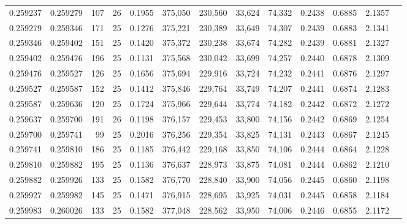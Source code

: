 \begin{tabular}{rrrrrrrrrrrrr}
0.259237 & 0.259279 &   107 &  26 &                                     0.1955 & 375,050 & 230,560 &  33,624 &  74,332 & 0.2438 & 0.6885 & 2.1357 \\
0.259279 & 0.259346 &   171 &  25 &                                     0.1276 & 375,221 & 230,389 &  33,649 &  74,307 & 0.2439 & 0.6883 & 2.1341 \\
0.259346 & 0.259402 &   151 &  25 &                                     0.1420 & 375,372 & 230,238 &  33,674 &  74,282 & 0.2439 & 0.6881 & 2.1327 \\
0.259402 & 0.259476 &   196 &  25 &                                     0.1131 & 375,568 & 230,042 &  33,699 &  74,257 & 0.2440 & 0.6878 & 2.1309 \\
0.259476 & 0.259527 &   126 &  25 &                                     0.1656 & 375,694 & 229,916 &  33,724 &  74,232 & 0.2441 & 0.6876 & 2.1297 \\
0.259527 & 0.259587 &   152 &  25 &                                     0.1412 & 375,846 & 229,764 &  33,749 &  74,207 & 0.2441 & 0.6874 & 2.1283 \\
0.259587 & 0.259636 &   120 &  25 &                                     0.1724 & 375,966 & 229,644 &  33,774 &  74,182 & 0.2442 & 0.6872 & 2.1272 \\
0.259637 & 0.259700 &   191 &  26 &                                     0.1198 & 376,157 & 229,453 &  33,800 &  74,156 & 0.2442 & 0.6869 & 2.1254 \\
0.259700 & 0.259741 &    99 &  25 &                                     0.2016 & 376,256 & 229,354 &  33,825 &  74,131 & 0.2443 & 0.6867 & 2.1245 \\
0.259741 & 0.259810 &   186 &  25 &                                     0.1185 & 376,442 & 229,168 &  33,850 &  74,106 & 0.2444 & 0.6864 & 2.1228 \\
0.259810 & 0.259882 &   195 &  25 &                                     0.1136 & 376,637 & 228,973 &  33,875 &  74,081 & 0.2444 & 0.6862 & 2.1210 \\
0.259882 & 0.259926 &   133 &  25 &                                     0.1582 & 376,770 & 228,840 &  33,900 &  74,056 & 0.2445 & 0.6860 & 2.1198 \\
0.259927 & 0.259982 &   145 &  25 &                                     0.1471 & 376,915 & 228,695 &  33,925 &  74,031 & 0.2445 & 0.6858 & 2.1184 \\
0.259983 & 0.260026 &   133 &  25 &                                     0.1582 & 377,048 & 228,562 &  33,950 &  74,006 & 0.2446 & 0.6855 & 2.1172 \\

\end{tabular}
